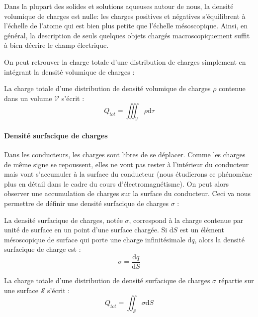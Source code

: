 \documentclass[11pt,fleqn]{book} %
\newcommand{\dd}{\mathrm{d}}
\begin{document}
\begin{remark}
    Dans la plupart des solides et solutions aqueuses autour de nous, la densité volumique de charges est nulle: les charges positives et négatives s'équilibrent à l'échelle de l'atome qui est bien plus petite que l'échelle mésoscopique. Ainsi, en général, la description de seuls quelques objets chargés macroscopiquement suffit à bien décrire le champ électrique.
\end{remark}

On peut retrouver la charge totale d'une distribution de charges simplement en intégrant la densité volumique de charges :
\begin{proposition}
    La charge totale d'une distribution de densité volumique de charges $\rho$ contenue dans un volume $\mathcal{V}$ s'écrit :
    \begin{equation}
        Q_{tot} = \iiint_{\mathcal{V}} \rho \dd \tau
    \end{equation}
\end{proposition}

\paragraph{Densité surfacique de charges}

Dans les conducteurs, les charges sont libres de se déplacer. Comme les charges de même signe se repoussent, elles ne vont pas rester à l'intérieur du conducteur mais vont s'accumuler à la surface du conducteur (nous étudierons ce phénomène plus en détail dans le cadre du cours d'électromagnétisme). On peut alors observer une accumulation de charges sur la surface du conducteur. Ceci va nous permettre de définir une densité surfacique de charges $\sigma$ :

\begin{definition}
    La densité surfacique de charges, notée $\sigma$, correspond à la charge contenue par unité de surface en un point d'une surface chargée. Si $\dd S$ est un élément mésoscopique de surface qui porte une charge infinitésimale $\dd q$, alors la densité surfacique de charge est :
    \begin{equation}
        \sigma = \frac{\dd q}{\dd S}
    \end{equation}
\end{definition}

\begin{proposition}
    La charge totale d'une distribution de densité surfacique de charges $\sigma$ répartie sur une surface $\mathcal{S}$ s'écrit :
    \begin{equation}
        Q_{tot} = \iint_{\mathcal{S}} \sigma \dd S
    \end{equation}
\end{proposition}
\end{document}
